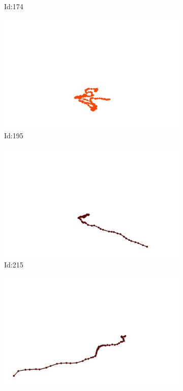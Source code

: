 \documentclass[12pt,twoside]{report}
\begin{document}
\begin{figure}
\begin{subfigure}[b]{0.20\textwidth}
\caption{Id:174}
\end{subfigure}
\begin{subfigure}[b]{0.20\textwidth}
\centering
\includegraphics[width=\textwidth]{../trajectories/195.png}
\caption{Id:195}
\end{subfigure}
\begin{subfigure}[b]{0.20\textwidth}
\centering
\includegraphics[width=\textwidth]{../trajectories/215.png}
\caption{Id:215}
\end{subfigure}
\begin{subfigure}[b]{0.20\textwidth}
\centering
\includegraphics[width=\textwidth]{../trajectories/285.png}

\end{subfigure}
\end{figure}
\end{document}
